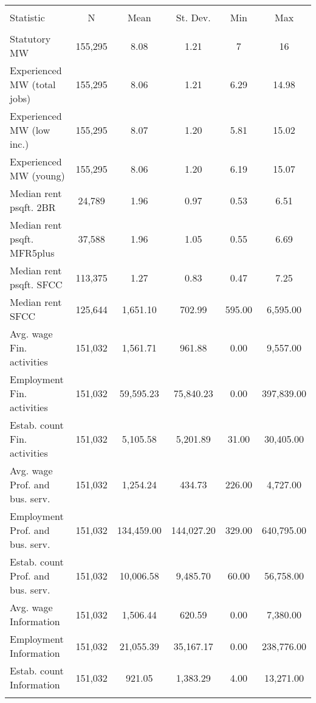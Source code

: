 
\begin{tabular}{@{\extracolsep{5pt}}lccccc} 
\\[-1.8ex]\hline 
\hline \\[-1.8ex] 
Statistic & \multicolumn{1}{c}{N} & \multicolumn{1}{c}{Mean} & \multicolumn{1}{c}{St. Dev.} & \multicolumn{1}{c}{Min} & \multicolumn{1}{c}{Max} \\ 
\hline \\[-1.8ex] 
Statutory MW & 155,295 & 8.08 & 1.21 & 7 & 16 \\ 
Experienced MW (total jobs) & 155,295 & 8.06 & 1.21 & 6.29 & 14.98 \\ 
Experienced MW (low inc.) & 155,295 & 8.07 & 1.20 & 5.81 & 15.02 \\ 
Experienced MW (young) & 155,295 & 8.06 & 1.20 & 6.19 & 15.07 \\ 
Median rent psqft. 2BR & 24,789 & 1.96 & 0.97 & 0.53 & 6.51 \\ 
Median rent psqft. MFR5plus & 37,588 & 1.96 & 1.05 & 0.55 & 6.69 \\ 
Median rent psqft. SFCC & 113,375 & 1.27 & 0.83 & 0.47 & 7.25 \\ 
Median rent SFCC & 125,644 & 1,651.10 & 702.99 & 595.00 & 6,595.00 \\ 
Avg. wage Fin. activities & 151,032 & 1,561.71 & 961.88 & 0.00 & 9,557.00 \\ 
Employment Fin. activities & 151,032 & 59,595.23 & 75,840.23 & 0.00 & 397,839.00 \\ 
Estab. count Fin. activities & 151,032 & 5,105.58 & 5,201.89 & 31.00 & 30,405.00 \\ 
Avg. wage Prof. and bus. serv. & 151,032 & 1,254.24 & 434.73 & 226.00 & 4,727.00 \\ 
Employment Prof. and bus. serv. & 151,032 & 134,459.00 & 144,027.20 & 329.00 & 640,795.00 \\ 
Estab. count Prof. and bus. serv. & 151,032 & 10,006.58 & 9,485.70 & 60.00 & 56,758.00 \\ 
Avg. wage Information & 151,032 & 1,506.44 & 620.59 & 0.00 & 7,380.00 \\ 
Employment Information & 151,032 & 21,055.39 & 35,167.17 & 0.00 & 238,776.00 \\ 
Estab. count Information & 151,032 & 921.05 & 1,383.29 & 4.00 & 13,271.00 \\ 
\hline \\[-1.8ex] 
\end{tabular} 
